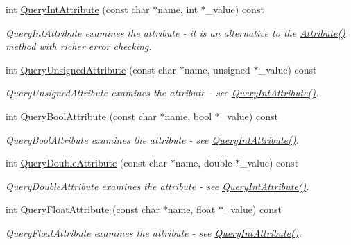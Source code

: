 \begin{DoxyCompactItemize}
int \hyperlink{class_ti_xml_element_aea0bfe471380f281c5945770ddbf52b9}{QueryIntAttribute} (const char $\ast$name, int $\ast$\_\-value) const 
\begin{DoxyCompactList}\small\item\em QueryIntAttribute examines the attribute -\/ it is an alternative to the \hyperlink{class_ti_xml_element_ac1e4691e9375ba4e665dce7e46a50a9c}{Attribute()} method with richer error checking. \end{DoxyCompactList}\item 
int \hyperlink{class_ti_xml_element_ae48df644f890ab86fa19839ac401f00d}{QueryUnsignedAttribute} (const char $\ast$name, unsigned $\ast$\_\-value) const 
\begin{DoxyCompactList}\small\item\em QueryUnsignedAttribute examines the attribute -\/ see \hyperlink{class_ti_xml_element_aea0bfe471380f281c5945770ddbf52b9}{QueryIntAttribute()}. \end{DoxyCompactList}\item 
int \hyperlink{class_ti_xml_element_af4a1d3f88c28eb0f3115dc39ebd83fff}{QueryBoolAttribute} (const char $\ast$name, bool $\ast$\_\-value) const 
\begin{DoxyCompactList}\small\item\em QueryBoolAttribute examines the attribute -\/ see \hyperlink{class_ti_xml_element_aea0bfe471380f281c5945770ddbf52b9}{QueryIntAttribute()}. \end{DoxyCompactList}\item 
int \hyperlink{class_ti_xml_element_a898d7730ecc341f0bffc7a9dadbf1ce7}{QueryDoubleAttribute} (const char $\ast$name, double $\ast$\_\-value) const 
\begin{DoxyCompactList}\small\item\em QueryDoubleAttribute examines the attribute -\/ see \hyperlink{class_ti_xml_element_aea0bfe471380f281c5945770ddbf52b9}{QueryIntAttribute()}. \end{DoxyCompactList}\item 
int \hyperlink{class_ti_xml_element_aa04d3af11601ef5a5f88295203a843be}{QueryFloatAttribute} (const char $\ast$name, float $\ast$\_\-value) const 
\begin{DoxyCompactList}\small\item\em QueryFloatAttribute examines the attribute -\/ see \hyperlink{class_ti_xml_element_aea0bfe471380f281c5945770ddbf52b9}{QueryIntAttribute()}. \end{DoxyCompactList}\item 

\end{DoxyCompactItemize}
